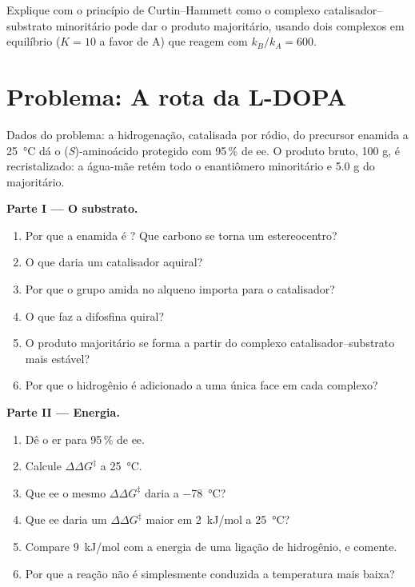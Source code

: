 \begin{exercise}[$\star\star\star$]\label{exo:b3:asymmetric-synthesis:12}
Explique com o princípio de Curtin--Hammett como o complexo catalisador--substrato
minoritário pode dar o produto majoritário, usando dois complexos em equilíbrio
($K = 10$ a favor de A) que reagem com $k_B/k_A = 600$.
\end{exercise}

\section{Problema: A rota da L-DOPA}

\begin{problem}
\label{pb:b3:asymmetric-synthesis:1}
Dados do problema: a hidrogenação, catalisada por ródio, do precursor enamida
a \qty{25}{\celsius} dá o (\textit{S})-aminoácido protegido com 95\,\% de ee. O produto
bruto, 100 g, é recristalizado: a água-mãe retém todo o enantiômero minoritário
e 5.0 g do majoritário.

\medskip\noindent\textbf{Parte I --- O substrato.}
\begin{enumerate}
  \item Por que a enamida é ? Que carbono se torna um estereocentro?
  \item O que daria um catalisador aquiral?
  \item Por que o grupo amida no alqueno importa para o catalisador?
  \item O que faz a difosfina quiral?
  \item O produto majoritário se forma a partir do complexo catalisador--substrato mais
        estável?
  \item Por que o hidrogênio é adicionado a uma única face em cada complexo?
\end{enumerate}

\medskip\noindent\textbf{Parte II --- Energia.}
\begin{enumerate}[resume]
  \item Dê o er para 95\,\% de ee.
  \item Calcule $\Delta\Delta G^\ddagger$ a \qty{25}{\celsius}.
  \item Que ee o mesmo $\Delta\Delta G^\ddagger$ daria a \qty{-78}{\celsius}?
  \item Que ee daria um $\Delta\Delta G^\ddagger$ maior em \qty{2}{kJ/mol} a \qty{25}{\celsius}?
  \item Compare \qty{9}{kJ/mol} com a energia de uma ligação de hidrogênio, e comente.
  \item Por que a reação não é simplesmente conduzida a temperatura mais baixa?
\end{enumerate}


\end{problem}
